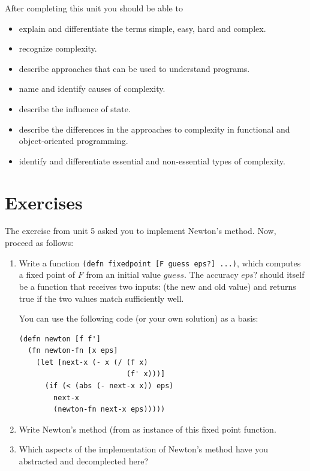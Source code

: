 \documentclass[11pt,a4paper]{article}
\begin{document}
After completing this unit you should be able to

\begin{itemize}
    \item explain and differentiate the terms simple, easy, hard and complex.
    \item recognize complexity.
    \item describe approaches that can be used to understand programs.
    \item name and identify causes of complexity.
    \item describe the influence of state.
    \item describe the differences in the approaches to complexity in functional and object-oriented programming.
    \item identify and differentiate essential and non-essential types of complexity.
\end{itemize}



\section{Exercises}


\begin{exercise}

The exercise from unit 5 asked you to implement Newton's method.
Now, proceed as follows:
    
\begin{enumerate}[label=\alph*)]
\item Write a function \texttt{(defn fixedpoint [F guess eps?] ...)}, which computes a fixed point of $F$ from an initial value $guess$.
    The accuracy $eps?$ should itself be a function that receives two inputs: (the new and old value) and returns true if the two values match sufficiently well.

    You can use the following code (or your own solution) as a basis:

\begin{verbatim}
(defn newton [f f']
  (fn newton-fn [x eps]
    (let [next-x (- x (/ (f x)
                         (f' x)))]
      (if (< (abs (- next-x x)) eps)
        next-x
        (newton-fn next-x eps)))))
\end{verbatim}

\item Write Newton's method (from as instance of this fixed point function.
\item Which aspects of the implementation of Newton's method have you abstracted and decomplected here?
\end{enumerate}
\end{exercise}
\end{document}
